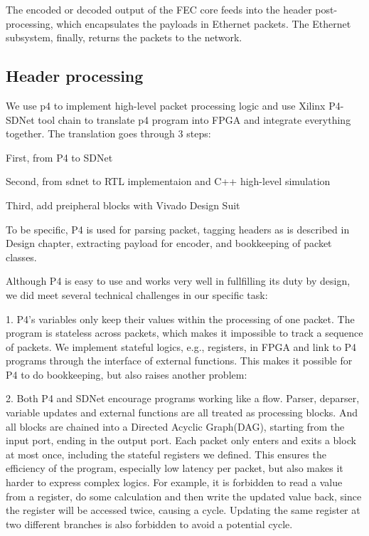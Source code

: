 The encoded or decoded output of the FEC core feeds into the header
post-processing, which encapsulates the payloads in Ethernet packets.  The
Ethernet subsystem, finally, returns the packets to the network.

\subsection{Header processing}

We use p4 to implement high-level packet processing logic and 
use Xilinx P4-SDNet tool chain to translate p4 program into FPGA and integrate everything together.
The translation goes through 3 steps:

First, from P4 to SDNet

Second, from sdnet to RTL implementaion and C++ high-level simulation

Third, add preipheral blocks with Vivado Design Suit

To be specific, P4 is used for parsing packet, tagging headers as is described in Design chapter,
extracting payload for encoder, and bookkeeping of packet classes.

Although P4 is easy to use and works very well in fullfilling its duty by design,
we did meet several technical challenges in our specific task:

1. P4's variables only keep their values within the processing of one packet.
The program is stateless across packets, which makes it impossible to track
a sequence of packets. We implement stateful logics, e.g., registers, in
FPGA and link to P4 programs through the interface of external functions.
This makes it possible for P4 to do bookkeeping, but also raises another problem:

2. Both P4 and SDNet encourage programs working like a flow. Parser, deparser,
variable updates and external functions are all treated as processing blocks. 
And all blocks are chained into a Directed Acyclic Graph(DAG), starting 
from the input port, ending in the output port. Each packet only enters
and exits a block at most once, including the stateful registers we defined.
This ensures the efficiency of the program, especially low latency per packet, 
but also makes it harder to express complex logics. For example, it is forbidden
to read a value from a register, do some calculation and then write the updated 
value back, since the register will be accessed twice, causing a cycle.
Updating the same register at two different branches is also forbidden to
avoid a potential cycle.

